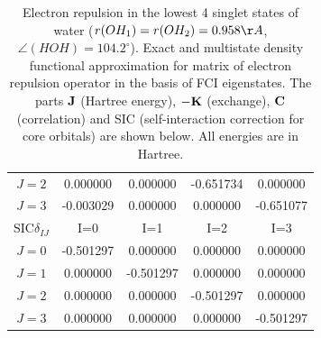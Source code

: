 \begin{table}
\begin{tabular}{
  SSSSS
  }
{$J=2$} & 0.000000& 0.000000& -0.651734& 0.000000\\
{$J=3$} & -0.003029& 0.000000& 0.000000& -0.651077\\
\toprule
{$\text{SIC} \delta_{IJ}$} & {I=0} & {I=1} & {I=2} & {I=3} \\
\midrule
{$J=0$} & -0.501297& 0.000000& 0.000000& 0.000000\\
{$J=1$} & 0.000000& -0.501297& 0.000000& 0.000000\\
{$J=2$} & 0.000000& 0.000000& -0.501297& 0.000000\\
{$J=3$} & 0.000000& 0.000000& 0.000000& -0.501297\\
\bottomrule
\end{tabular}

\caption{
\label{tbl:water_electron_repulsion}    
Electron repulsion in the lowest 4 singlet states of water ($r(OH_1)=r(OH_2)=0.958 \AA$, $\angle(HOH) = 104.2^{\circ}$).
Exact and multistate density functional approximation for matrix of electron repulsion operator
in the basis of FCI eigenstates. The parts $\m{J}$ (Hartree energy), $-\m{K}$ (exchange), $\m{C}$ (correlation)
and SIC (self-interaction correction for core orbitals) are shown below.
All energies are in Hartree.}
\end{table}
    
